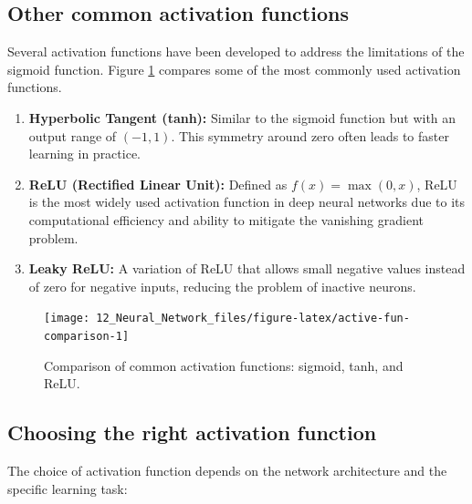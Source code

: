 \documentclass[
  11pt,
]{book}
\providecommand{\tightlist}{%
  \setlength{\itemsep}{0pt}\setlength{\parskip}{0pt}}
\theoremstyle{definition}
\theoremstyle{definition}
\theoremstyle{definition}
\theoremstyle{definition}
\theoremstyle{remark}
\begin{document}
\subsection*{Other common activation functions}\label{other-common-activation-functions}


Several activation functions have been developed to address the limitations of the sigmoid function. Figure \ref{fig:active-fun-comparison} compares some of the most commonly used activation functions.

\begin{enumerate}
\def\labelenumi{\arabic{enumi}.}
\tightlist
\item
  \textbf{Hyperbolic Tangent (tanh):} Similar to the sigmoid function but with an output range of \((-1, 1)\). This symmetry around zero often leads to faster learning in practice.\\
\item
  \textbf{ReLU (Rectified Linear Unit):} Defined as \(f(x) = \max(0, x)\), ReLU is the most widely used activation function in deep neural networks due to its computational efficiency and ability to mitigate the vanishing gradient problem.\\
\item
  \textbf{Leaky ReLU:} A variation of ReLU that allows small negative values instead of zero for negative inputs, reducing the problem of inactive neurons.
\end{enumerate}

\begin{figure}[H]

{\centering \texttt{[image: 12\_Neural\_Network\_files/figure-latex/active-fun-comparison-1]} 

}

\caption{Comparison of common activation functions: sigmoid, tanh, and ReLU.}\label{fig:active-fun-comparison}
\end{figure}

\subsection*{Choosing the right activation function}\label{choosing-the-right-activation-function}


The choice of activation function depends on the network architecture and the specific learning task:
\end{document}
